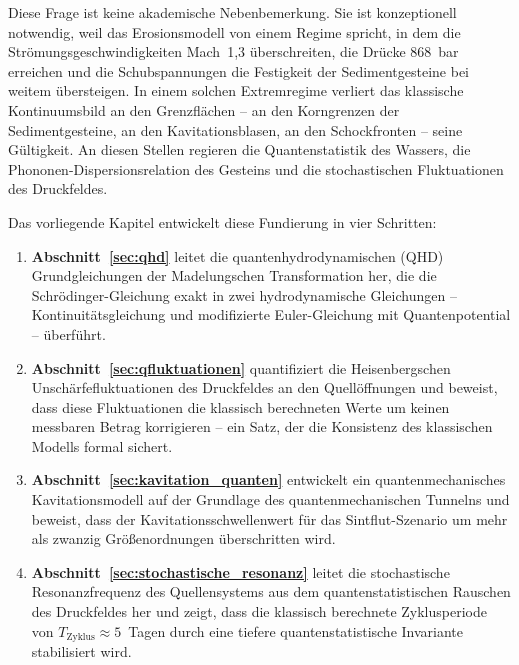 ﻿\documentclass[12pt,a4paper]{report}
\begin{document}
\begin{center}
\end{center}

Diese Frage ist keine akademische Nebenbemerkung. Sie ist konzeptionell notwendig, weil das Erosionsmodell von einem Regime spricht, in dem die Strömungsgeschwindigkeiten Mach~1,3 überschreiten, die Drücke 868~bar erreichen und die Schubspannungen die Festigkeit der Sedimentgesteine bei weitem übersteigen. In einem solchen Extremregime verliert das klassische Kontinuumsbild an den Grenzflächen -- an den Korngrenzen der Sedimentgesteine, an den Kavitationsblasen, an den Schockfronten -- seine Gültigkeit. An diesen Stellen regieren die Quantenstatistik des Wassers, die Phononen-Dispersionsrelation des Gesteins und die stochastischen Fluktuationen des Druckfeldes.

Das vorliegende Kapitel entwickelt diese Fundierung in vier Schritten:

\begin{enumerate}
	\item \textbf{Abschnitt~\ref{sec:qhd}} leitet die quantenhydrodynamischen (QHD) Grundgleichungen der Madelungschen Transformation her, die die Schrödinger-Gleichung exakt in zwei hydrodynamische Gleichungen -- Kontinuitätsgleichung und modifizierte Euler-Gleichung mit Quantenpotential -- überführt.
	
	\item \textbf{Abschnitt~\ref{sec:qfluktuationen}} quantifiziert die Heisenbergschen Unschärfefluktuationen des Druckfeldes an den Quellöffnungen und beweist, dass diese Fluktuationen die klassisch berechneten Werte um keinen messbaren Betrag korrigieren -- ein Satz, der die Konsistenz des klassischen Modells formal sichert.
	
	\item \textbf{Abschnitt~\ref{sec:kavitation_quanten}} entwickelt ein quantenmechanisches Kavitationsmodell auf der Grundlage des quantenmechanischen Tunnelns und beweist, dass der Kavitationsschwellenwert für das Sintflut-Szenario um mehr als zwanzig Größenordnungen überschritten wird.
	
	\item \textbf{Abschnitt~\ref{sec:stochastische_resonanz}} leitet die stochastische Resonanzfrequenz des Quellensystems aus dem quantenstatistischen Rauschen des Druckfeldes her und zeigt, dass die klassisch berechnete Zyklusperiode von $T_\mathrm{Zyklus} \approx 5$~Tagen durch eine tiefere quantenstatistische Invariante stabilisiert wird.
\end{enumerate}
\end{document}
